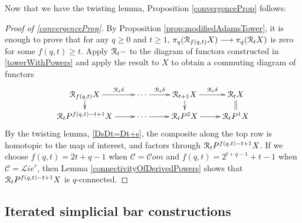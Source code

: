 \documentclass[11pt]{amsart} \renewcommand{\baselinestretch}{1.2}
\theoremstyle{plain}
\theoremstyle{definition}
\newcommand{\DASH}{\mathrm{-}}
\renewcommand{\to}{\longrightarrow}
\newcommand{\scrL}{\mathscr{L}}
\newcommand{\scrC}{\mathscr{C}}
\newcommand{\calR}{\mathcal{R}}
\newcommand{\calc}{\mathcal{C}}
\newcommand{\algs}{{\scrC\!\textit{om}}}
\newcommand{\restliealgs}{{\scrL\!\textit{ie}^\textit{r}}}
\newcommand{\algcat}{{\calc}}%
\newcommand{\caldup}[1]{\calR_{\smash{#1}}}
\begin{document}
\begin{Bousfield-Kan spectral sequence}
Now that we have the twisting lemma, Proposition \ref{convergenceProp} follows:
\begin{proof}[Proof of \ref{convergenceProp}]
By Proposition \ref{prop:modifiedAdamsTower}, it is enough to prove that for any $q\geq0$ and $t\geq1$, $\pi_q(\caldup{f(q,t)}X)\to\pi_q(\caldup{t}X)$ is zero for some $f(q,t)\geq t$.
Apply $\caldup{t}\DASH$ to the diagram of functors constructed in \ref{towerWithPowers} and apply the result to $X$ to obtain a commuting diagram of functors
\[\xymatrix@R=4mm{
\caldup{f(q,t)}X
\ar[r]^-{\caldup{t}\delta}
\ar[d]
&
\cdots \ar[r]^-{\caldup{t}\delta}
&%
\caldup{t+1}X
\ar[r]^-{\caldup{t}\delta}
\ar[d]&%
\caldup{t}X
\ar@{=}[d]
\\%
\caldup{t}P^{f(q,t)-t+1}X
\ar[r]
&%
\cdots 
\ar[r]&%
\caldup{t}P^2X
\ar[r]
&%
\caldup{t}P^1X%
}\]
By the twisting lemma, \ref{DsDt=Dt+s}, the composite along the top row is homotopic to the map of interest, and factors through $\caldup{t}P^{f(q,t)-t+1}X$. If we choose $f(q,t)=2t+q-1$ when $\algcat=\algs$ and $f(q,t)=2^{t+q-1}+t-1$ when $\algcat=\restliealgs$, then Lemma \ref{connectivityOfDerivedPowers} shows that $\caldup{t}P^{f(q,t)-t+1}X$  is $q$-connected.
\end{proof}

\subsection{Iterated simplicial bar constructions}\label{sec:ItSimpBar}



\end{Bousfield-Kan spectral sequence}
\end{document}
